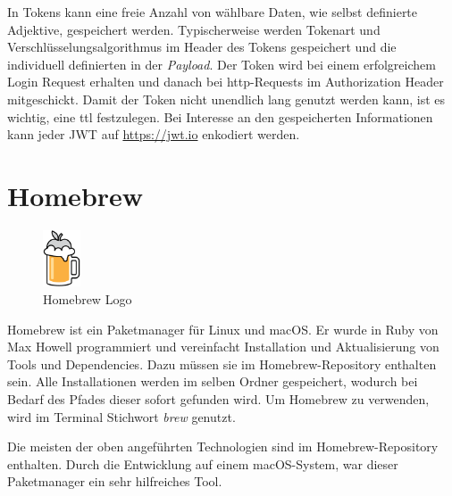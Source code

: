 In Tokens kann eine freie Anzahl von wählbare Daten, wie selbst definierte Adjektive, gespeichert werden. 
Typischerweise werden Tokenart und Verschlüsselungsalgorithmus im Header des Tokens gespeichert und die individuell definierten in der \emph{Payload}.
Der Token wird bei einem erfolgreichem Login Request erhalten und danach bei \gls{http}-Requests im Authorization Header mitgeschickt. 
Damit der Token nicht unendlich lang genutzt werden kann, ist es wichtig, eine \gls{ttl} festzulegen. 
Bei Interesse an den gespeicherten Informationen kann jeder JWT auf \href{https://jwt.io}{https://jwt.io} enkodiert werden.
\cite{JWTAbout}

\section{Homebrew}
\begin{figure}
  \begin{center}
      \includegraphics[width=0.1\textwidth]{pics/logos/brew.png}
      \caption{Homebrew Logo}
  \end{center}
\end{figure}
Homebrew ist ein Paketmanager für Linux und macOS. 
Er wurde in Ruby von Max Howell programmiert und vereinfacht Installation und Aktualisierung von Tools und Dependencies. 
Dazu müssen sie im Homebrew-Repository enthalten sein. 
Alle Installationen werden im selben Ordner gespeichert, wodurch bei Bedarf des Pfades dieser sofort gefunden wird. 
Um Homebrew zu verwenden, wird im Terminal Stichwort \emph{brew} genutzt. 

Die meisten der oben angeführten Technologien sind im Homebrew-Repository enthalten. 
Durch die Entwicklung auf einem macOS-System, war dieser Paketmanager ein sehr hilfreiches Tool. 
\cite{brewAbout}


